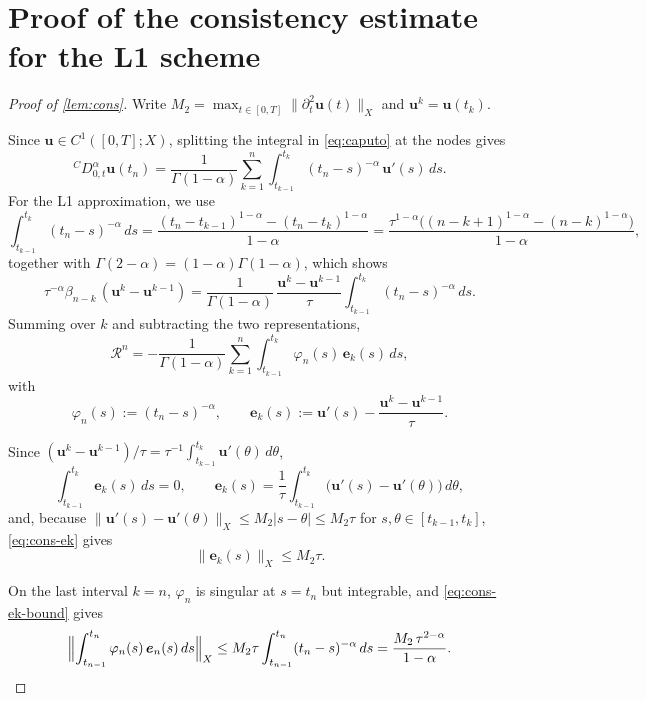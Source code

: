 \documentclass[11pt,a4paper]{article}
\numberwithin{equation}{section}
\theoremstyle{plain}
\theoremstyle{definition}
\theoremstyle{remark}
\newcommand{\CD}{{}^{C}\!D_{0,t}^{\alpha}}   %
\begin{document}
\appendix
\section{Proof of the consistency estimate for the L1 scheme}\label{app:cons}
\begin{proof}[Proof of \eqref{lem:cons}]
Write $M_2=\max_{t\in[0,T]}\|\partial_t^2\bm u(t)\|_X$ and $\bm u^k=\bm u(t_k)$.

Since $\bm u\in C^1([0,T];X)$, splitting the integral in \eqref{eq:caputo} at the nodes gives
\[
\CD\bm u(t_n)=\frac1{\Gamma(1-\alpha)}\sum_{k=1}^n\int_{t_{k-1}}^{t_k}(t_n-s)^{-\alpha}\,\bm u'(s)\,ds .
\]
For the L1 approximation, we use
\[
\int_{t_{k-1}}^{t_k}(t_n-s)^{-\alpha}\,ds=\frac{(t_n-t_{k-1})^{1-\alpha}-(t_n-t_k)^{1-\alpha}}{1-\alpha}=\frac{\tau^{1-\alpha}\bigl((n-k+1)^{1-\alpha}-(n-k)^{1-\alpha}\bigr)}{1-\alpha},
\]
together with $\Gamma(2-\alpha)=(1-\alpha)\Gamma(1-\alpha)$, which shows
\[
\tau^{-\alpha}\beta_{n-k}\,(\bm u^k-\bm u^{k-1})=\frac1{\Gamma(1-\alpha)}\,\frac{\bm u^k-\bm u^{k-1}}\tau\int_{t_{k-1}}^{t_k}(t_n-s)^{-\alpha}\,ds .
\]
Summing over $k$ and subtracting the two representations,
\begin{equation}\label{eq:cons-integral}
\mathcal R^n=-\frac1{\Gamma(1-\alpha)}\sum_{k=1}^n\int_{t_{k-1}}^{t_k}\varphi_n(s)\,\bm e_k(s)\,ds,
\end{equation}
with
\[
\varphi_n(s):=(t_n-s)^{-\alpha},\qquad \bm e_k(s):=\bm u'(s)-\frac{\bm u^k-\bm u^{k-1}}\tau .
\]

Since $(\bm u^k-\bm u^{k-1})/\tau=\tau^{-1}\int_{t_{k-1}}^{t_k}\bm u'(\theta)\,d\theta$,
\begin{equation}\label{eq:cons-ek}
\int_{t_{k-1}}^{t_k}\bm e_k(s)\,ds=0,\qquad
\bm e_k(s)=\frac1\tau\int_{t_{k-1}}^{t_k}\bigl(\bm u'(s)-\bm u'(\theta)\bigr)\,d\theta,
\end{equation}
and, because $\|\bm u'(s)-\bm u'(\theta)\|_X\le M_2|s-\theta|\le M_2\tau$ for $s,\theta\in[t_{k-1},t_k]$, \eqref{eq:cons-ek} gives
\begin{equation}\label{eq:cons-ek-bound}
\|\bm e_k(s)\|_X\le M_2\tau .
\end{equation}

On the last interval $k=n$, $\varphi_n$ is singular at $s=t_n$ but integrable, and \eqref{eq:cons-ek-bound} gives
\begin{equation}\label{eq:cons-last}
\Bigl\|\int_{t_{n-1}}^{t_n}\varphi_n(s)\,\bm e_n(s)\,ds\Bigr\|_X\le M_2\tau\int_{t_{n-1}}^{t_n}(t_n-s)^{-\alpha}\,ds=\frac{M_2\,\tau^{2-\alpha}}{1-\alpha}.
\end{equation}


\end{proof}
\end{document}
